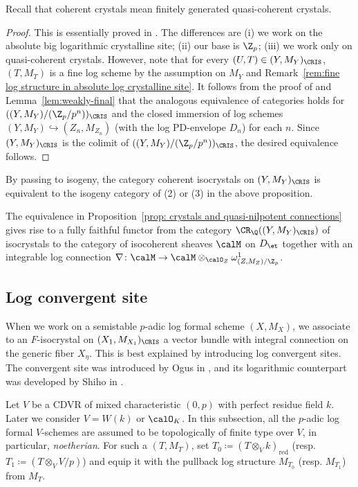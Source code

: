 Recall that coherent crystals mean finitely generated quasi-coherent crystals.

\begin{proof}
This is essentially proved in \cite[Thm.~6.2]{Kato-log}. The differences are (i) we work on the absolute big logarithmic crystalline site; (ii) our base is $\Z_p$; (iii) we work only on quasi-coherent crystals.
However, note that for every $(U,T)\in (Y,M_Y)_\CRIS$, $(T,M_T)$ is a fine log scheme by the assumption on $M_Y$ and Remark~\ref{rem:fine log structure in absolute log crystalline site}. It follows from the proof of \cite[Thm.~6.2]{Kato-log} and Lemma~\ref{lem:weakly-final} that the analogous equivalence of categories holds for $((Y,M_Y)/(\Z_p/p^n))_\CRIS$ and the closed immersion of log schemes $(Y,M_Y)\hookrightarrow (Z_n,M_{Z_n})$ (with the log PD-envelope $D_n$) for each $n$. Since $(Y,M_Y)_\CRIS$ is the colimit of $((Y,M_Y)/(\Z_p/p^n))_\CRIS$, the desired equivalence follows. 
\end{proof}

By passing to isogeny, the category coherent isocrystals on $(Y,M_Y)_\CRIS$ is equivalent to the isogeny category of (2) or (3) in the above proposition. 

\begin{cor} \label{cor:iso-crystals and quasi-nilpotent connections} 
The equivalence in Proposition~\ref{prop: crystals and quasi-nilpotent connections} gives rise to a fully faithful functor from the category $\CR_\Q((Y,M_Y)_\CRIS)$ of isocrystals to the category of isocoherent sheaves $\calM$ on $D_{\et}$ together with an integrable log connection $\nabla\colon \calM\rightarrow \calM\otimes_{\calO_Z}\omega^1_{(Z,M_Z)/\Z_p}$.
\end{cor}


\subsection{Log convergent site}\label{sec:log convergent site}

When we work on a semistable $p$-adic log formal scheme $(X,M_X)$, we associate to an $F$-isocrystal on $(X_1,M_{X_1})_\CRIS$ a vector bundle with integral connection on the generic fiber $X_\eta$. This is best explained by introducing log convergent sites. The convergent site was introduced by Ogus in \cite{ogus-F-converg-isocryst-de-rham-cohom-II, Ogus-convergenttopos}, and its logarithmic counterpart was developed by Shiho in \cite{Shiho-I, Shiho-II}.

Let $V$ be a CDVR of mixed characteristic $(0,p)$ with perfect residue field $k$. Later we consider $V=W(k)$ or $\calO_K$.
In this subsection, all the $p$-adic log formal $V$-schemes are assumed to be topologically of finite type over $V$, in particular, \emph{noetherian}.
For such a $(T,M_T)$, set $T_0\coloneqq (T\otimes_Vk)_\mathrm{red}$ (resp. $T_1\coloneqq (T\otimes_V V/p)$) and equip it with the pullback log structure $M_{T_0}$ (resp. $M_{T_1}$) from $M_T$.

